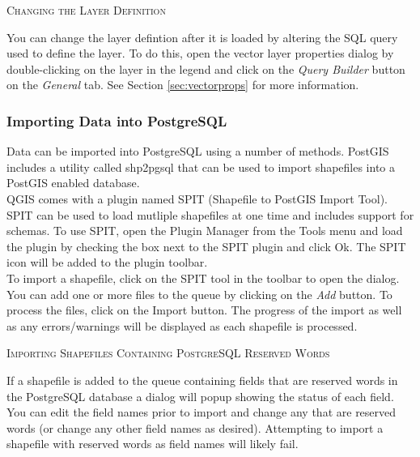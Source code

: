 \documentclass[10pt,english]{article}
\newcommand\qgistip[1]{\raggedright\small{#1}}
\begin{document}
\begin{onehalfspace}
\begin{Tip}\caption{\textsc{Changing the Layer Definition}}
\qgistip{You can change the layer defintion after it is loaded by altering the
SQL query used to define the layer. To do this, open the vector layer properties
dialog by double-clicking on the layer in the legend and click on the
\textit{Query Builder} button on the \textit{General} tab. See Section
\ref{sec:vectorprops} for more information.}
\end{Tip}

\subsubsection{Importing Data into PostgreSQL}\label{sec:loading_postgis_data}
Data can be imported into PostgreSQL using a number of methods. PostGIS includes a utility called shp2pgsql that can be used to import shapefiles into a PostGIS enabled database. \\

QGIS comes with a
plugin named SPIT (Shapefile to PostGIS Import Tool).
SPIT can be used to load mutliple shapefiles at one time and includes support
for schemas. To use SPIT, open the Plugin Manager from the Tools menu and load
the plugin by checking the box next to the SPIT plugin and click Ok. The SPIT
icon will be added to the plugin toolbar. \\

To import a shapefile, click on the SPIT tool in the toolbar to open the dialog.
You can add one or more files to the queue by clicking on the \textsl{Add}
button. To process the files, click on the Import button. The progress of the
import as well as any errors/warnings will be displayed as each shapefile is
processed.  
\begin{Tip}\caption{\textsc{Importing Shapefiles Containing
PostgreSQL Reserved Words}}
\qgistip{If a shapefile is added to the queue containing fields that are
reserved words in the PostgreSQL database a dialog will popup showing the status
of each field. You can edit the field names\index{SPIT!editing field names}
prior to import and change any that are reserved words (or change any other
field names as desired). Attempting to
import a shapefile with reserved words as field names will likely fail.}
\end{Tip} 

\end{onehalfspace}
\end{document}
